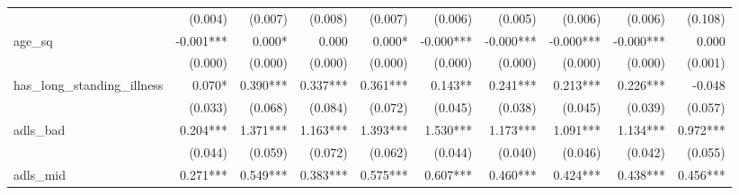 \begin{tabular}{lrrrrrrrrr}
                             &                        (0.004) &                     (0.007) &                         (0.008) &                          (0.007) &                     (0.006) &                     (0.005) &                         (0.006) &                          (0.006) &                    (0.108) \\ 
age_sq                       &                      -0.001*** &                      0.000* &                           0.000 &                           0.000* &                   -0.000*** &                   -0.000*** &                       -0.000*** &                        -0.000*** &                      0.000 \\ 
                             &                        (0.000) &                     (0.000) &                         (0.000) &                          (0.000) &                     (0.000) &                     (0.000) &                         (0.000) &                          (0.000) &                    (0.001) \\ 
has_long_standing_illness    &                         0.070* &                    0.390*** &                        0.337*** &                         0.361*** &                     0.143** &                    0.241*** &                        0.213*** &                         0.226*** &                     -0.048 \\ 
                             &                        (0.033) &                     (0.068) &                         (0.084) &                          (0.072) &                     (0.045) &                     (0.038) &                         (0.045) &                          (0.039) &                    (0.057) \\ 
adls_bad                     &                       0.204*** &                    1.371*** &                        1.163*** &                         1.393*** &                    1.530*** &                    1.173*** &                        1.091*** &                         1.134*** &                   0.972*** \\ 
                             &                        (0.044) &                     (0.059) &                         (0.072) &                          (0.062) &                     (0.044) &                     (0.040) &                         (0.046) &                          (0.042) &                    (0.055) \\ 
adls_mid                     &                       0.271*** &                    0.549*** &                        0.383*** &                         0.575*** &                    0.607*** &                    0.460*** &                        0.424*** &                         0.438*** &                   0.456*** \\ 

\end{tabular}
